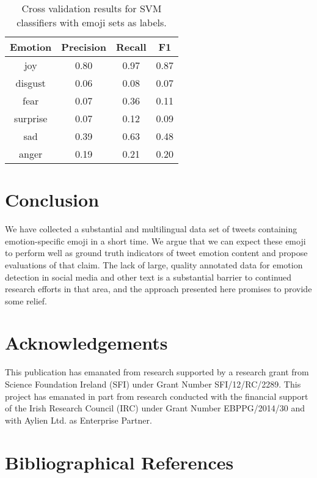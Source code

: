 \documentclass[10pt, a4paper]{article}
\begin{document}

\begin{table}[!ht]
\centering
\begin{tabular}{c | c | c | c}
\textbf{Emotion} & \textbf{Precision}  & \textbf{Recall} & \textbf{F1} \\
\hline
             joy & 0.80       & 0.97   & 0.87 \\
         disgust & 0.06       & 0.08   & 0.07 \\
            fear & 0.07       & 0.36   & 0.11 \\
        surprise & 0.07       & 0.12   & 0.09 \\
             sad & 0.39       & 0.63   & 0.48 \\
           anger & 0.19       & 0.21   & 0.20 \\
\end{tabular}
\caption{Cross validation results for SVM classifiers with emoji sets as labels.}
\label{tab:SVM-CV-results}
\end{table}



\section{Conclusion}

We have collected a substantial and multilingual data set of tweets containing emotion-specific emoji in a short time. We argue that we can expect these emoji to perform well as ground truth indicators of tweet emotion content and propose evaluations of that claim. 
The lack of large, quality annotated data for emotion detection in social media and other text is a substantial barrier to continued research efforts in that area, and the approach presented here promises to provide some relief.

\section*{Acknowledgements}

This publication has emanated from research supported by a research grant from Science Foundation Ireland (SFI) under Grant Number SFI/12/RC/2289.
This project has emanated in part from research conducted with the financial support of the Irish Research Council (IRC) under Grant Number EBPPG/2014/30 and with Aylien Ltd. as Enterprise Partner. 

\section{Bibliographical References}
\label{m%
%
%
ain:ref}


% 

\end{document}
